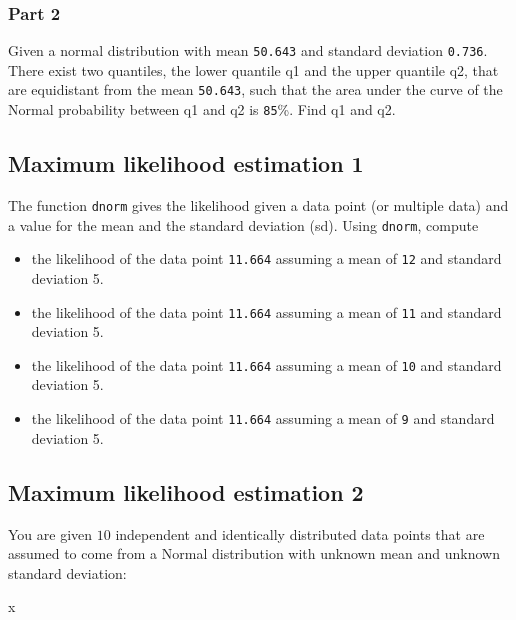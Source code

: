 \documentclass[12pt,]{krantz}
\newenvironment{Shaded}{\begin{snugshade}}{\end{snugshade}}
\newcommand{\NormalTok}[1]{#1}
\providecommand{\tightlist}{%
  \setlength{\itemsep}{0pt}\setlength{\parskip}{0pt}}
\begin{document}
\hypertarget{sec:FoundationsexercisesqnormPart2}{%
\subsubsection{Part 2}\label{sec:FoundationsexercisesqnormPart2}}

Given a normal distribution with mean \texttt{50.643} and standard deviation \texttt{0.736}. There exist two quantiles, the lower quantile q1 and the upper quantile q2, that are equidistant from the mean \texttt{50.643}, such that the area under the curve of the Normal probability between q1 and q2 is \texttt{85}\%. Find q1 and q2.

\hypertarget{sec:FoundationsexercisesMLE1}{%
\subsection{Maximum likelihood estimation 1}\label{sec:FoundationsexercisesMLE1}}

The function \texttt{dnorm} gives the likelihood given a data point (or multiple data) and a value for the mean and the standard deviation (sd). Using \texttt{dnorm}, compute

\begin{itemize}
\tightlist
\item
  the likelihood of the data point \texttt{11.664} assuming a mean of \texttt{12} and standard deviation 5.
\item
  the likelihood of the data point \texttt{11.664} assuming a mean of \texttt{11} and standard deviation 5.
\item
  the likelihood of the data point \texttt{11.664} assuming a mean of \texttt{10} and standard deviation 5.
\item
  the likelihood of the data point \texttt{11.664} assuming a mean of \texttt{9} and standard deviation 5.
\end{itemize}

\hypertarget{sec:FoundationsexercisesMLE2}{%
\subsection{Maximum likelihood estimation 2}\label{sec:FoundationsexercisesMLE2}}

You are given \(10\) independent and identically distributed data points that are assumed to come from a Normal distribution with unknown mean and unknown standard deviation:

\begin{Shaded}
\begin{Highlighting}[]
\NormalTok{x}
\end{Highlighting}
\end{Shaded}
\end{document}
